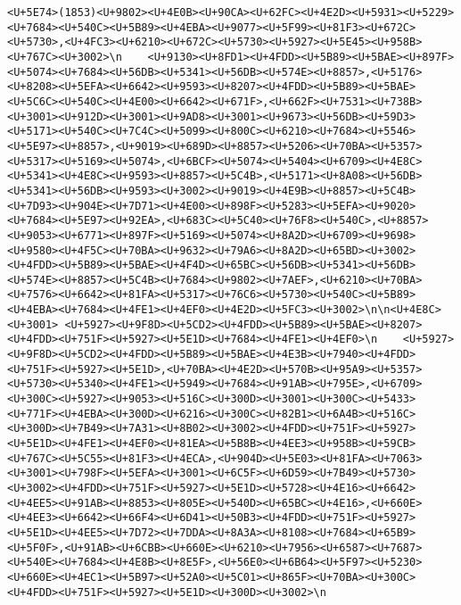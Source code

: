 \documentclass[
]{article}
\begin{document}
\begin{verbatim}
<U+5E74>(1853)<U+9802><U+4E0B><U+90CA><U+62FC><U+4E2D><U+5931><U+5229><U+7684><U+540C><U+5B89><U+4EBA><U+9077><U+5F99><U+81F3><U+672C><U+5730>,<U+4FC3><U+6210><U+672C><U+5730><U+5927><U+5E45><U+958B><U+767C><U+3002>\n    <U+9130><U+8FD1><U+4FDD><U+5B89><U+5BAE><U+897F><U+5074><U+7684><U+56DB><U+5341><U+56DB><U+574E><U+8857>,<U+5176><U+8208><U+5EFA><U+6642><U+9593><U+8207><U+4FDD><U+5B89><U+5BAE><U+5C6C><U+540C><U+4E00><U+6642><U+671F>,<U+662F><U+7531><U+738B><U+3001><U+912D><U+3001><U+9AD8><U+3001><U+9673><U+56DB><U+59D3><U+5171><U+540C><U+7C4C><U+5099><U+800C><U+6210><U+7684><U+5546><U+5E97><U+8857>,<U+9019><U+689D><U+8857><U+5206><U+70BA><U+5357><U+5317><U+5169><U+5074>,<U+6BCF><U+5074><U+5404><U+6709><U+4E8C><U+5341><U+4E8C><U+9593><U+8857><U+5C4B>,<U+5171><U+8A08><U+56DB><U+5341><U+56DB><U+9593><U+3002><U+9019><U+4E9B><U+8857><U+5C4B><U+7D93><U+904E><U+7D71><U+4E00><U+898F><U+5283><U+5EFA><U+9020><U+7684><U+5E97><U+92EA>,<U+683C><U+5C40><U+76F8><U+540C>,<U+8857><U+9053><U+6771><U+897F><U+5169><U+5074><U+8A2D><U+6709><U+9698><U+9580><U+4F5C><U+70BA><U+9632><U+79A6><U+8A2D><U+65BD><U+3002><U+4FDD><U+5B89><U+5BAE><U+4F4D><U+65BC><U+56DB><U+5341><U+56DB><U+574E><U+8857><U+5C4B><U+7684><U+9802><U+7AEF>,<U+6210><U+70BA><U+7576><U+6642><U+81FA><U+5317><U+76C6><U+5730><U+540C><U+5B89><U+4EBA><U+7684><U+4FE1><U+4EF0><U+4E2D><U+5FC3><U+3002>\n\n<U+4E8C><U+3001> <U+5927><U+9F8D><U+5CD2><U+4FDD><U+5B89><U+5BAE><U+8207><U+4FDD><U+751F><U+5927><U+5E1D><U+7684><U+4FE1><U+4EF0>\n    <U+5927><U+9F8D><U+5CD2><U+4FDD><U+5B89><U+5BAE><U+4E3B><U+7940><U+4FDD><U+751F><U+5927><U+5E1D>,<U+70BA><U+4E2D><U+570B><U+95A9><U+5357><U+5730><U+5340><U+4FE1><U+5949><U+7684><U+91AB><U+795E>,<U+6709><U+300C><U+5927><U+9053><U+516C><U+300D><U+3001><U+300C><U+5433><U+771F><U+4EBA><U+300D><U+6216><U+300C><U+82B1><U+6A4B><U+516C><U+300D><U+7B49><U+7A31><U+8B02><U+3002><U+4FDD><U+751F><U+5927><U+5E1D><U+4FE1><U+4EF0><U+81EA><U+5B8B><U+4EE3><U+958B><U+59CB><U+767C><U+5C55><U+81F3><U+4ECA>,<U+904D><U+5E03><U+81FA><U+7063><U+3001><U+798F><U+5EFA><U+3001><U+6C5F><U+6D59><U+7B49><U+5730><U+3002><U+4FDD><U+751F><U+5927><U+5E1D><U+5728><U+4E16><U+6642><U+4EE5><U+91AB><U+8853><U+805E><U+540D><U+65BC><U+4E16>,<U+660E><U+4EE3><U+6642><U+66F4><U+6D41><U+50B3><U+4FDD><U+751F><U+5927><U+5E1D><U+4EE5><U+7D72><U+7DDA><U+8A3A><U+8108><U+7684><U+65B9><U+5F0F>,<U+91AB><U+6CBB><U+660E><U+6210><U+7956><U+6587><U+7687><U+540E><U+7684><U+4E8B><U+8E5F>,<U+56E0><U+6B64><U+5F97><U+5230><U+660E><U+4EC1><U+5B97><U+52A0><U+5C01><U+865F><U+70BA><U+300C><U+4FDD><U+751F><U+5927><U+5E1D><U+300D><U+3002>\n    
\end{verbatim}
\end{document}
